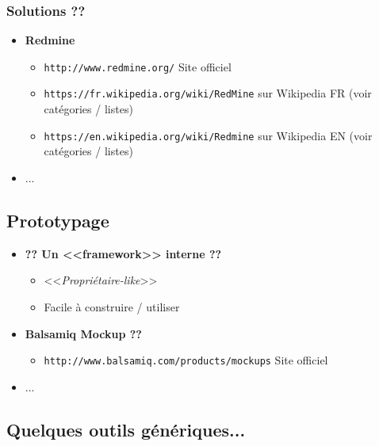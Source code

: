 \documentclass[11pt,twoside,a4paper]{article}
\begin{document}
\subsubsection{Solutions ??}
\begin{itemize}
	\item[] \textbf{Redmine}
	\begin{itemize}
		\item[] \texttt{http://www.redmine.org/} Site officiel
		\item[] \texttt{https://fr.wikipedia.org/wiki/RedMine} sur Wikipedia FR (voir cat{\'e}gories / listes)
		\item[] \texttt{https://en.wikipedia.org/wiki/Redmine} sur Wikipedia EN (voir cat{\'e}gories / listes)
	\end{itemize}
	\item[] ...
\end{itemize}

\subsection{Prototypage}

\begin{itemize}
	\item[] \textbf{?? Un <<framework>> interne ??}
	\begin{itemize}
		\item[] <<\textit{Propriétaire-like}>>
		\item[] Facile {\`a} construire / utiliser
	\end{itemize}
	\item[] \textbf{Balsamiq Mockup ??}
	\begin{itemize}
		\item[] \texttt{http://www.balsamiq.com/products/mockups} Site officiel
	\end{itemize}
	\item[] ...
\end{itemize}

\clearpage

\subsection{Quelques outils g{\'e}n{\'e}riques...}
\end{document}
